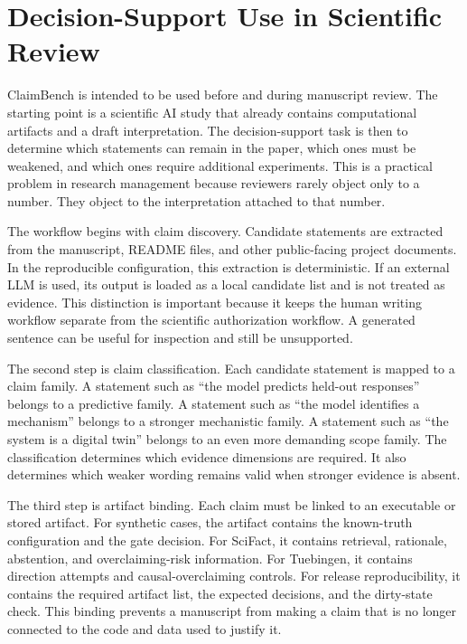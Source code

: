 \section{Decision-Support Use in Scientific Review}
\label{sec:decision-support-use}

ClaimBench is intended to be used before and during manuscript review. The starting point is a scientific AI study that already contains computational artifacts and a draft interpretation. The decision-support task is then to determine which statements can remain in the paper, which ones must be weakened, and which ones require additional experiments. This is a practical problem in research management because reviewers rarely object only to a number. They object to the interpretation attached to that number.

The workflow begins with claim discovery. Candidate statements are extracted from the manuscript, README files, and other public-facing project documents. In the reproducible configuration, this extraction is deterministic. If an external LLM is used, its output is loaded as a local candidate list and is not treated as evidence. This distinction is important because it keeps the human writing workflow separate from the scientific authorization workflow. A generated sentence can be useful for inspection and still be unsupported.

The second step is claim classification. Each candidate statement is mapped to a claim family. A statement such as ``the model predicts held-out responses'' belongs to a predictive family. A statement such as ``the model identifies a mechanism'' belongs to a stronger mechanistic family. A statement such as ``the system is a digital twin'' belongs to an even more demanding scope family. The classification determines which evidence dimensions are required. It also determines which weaker wording remains valid when stronger evidence is absent.

The third step is artifact binding. Each claim must be linked to an executable or stored artifact. For synthetic cases, the artifact contains the known-truth configuration and the gate decision. For SciFact, it contains retrieval, rationale, abstention, and overclaiming-risk information. For Tuebingen, it contains direction attempts and causal-overclaiming controls. For release reproducibility, it contains the required artifact list, the expected decisions, and the dirty-state check. This binding prevents a manuscript from making a claim that is no longer connected to the code and data used to justify it.

